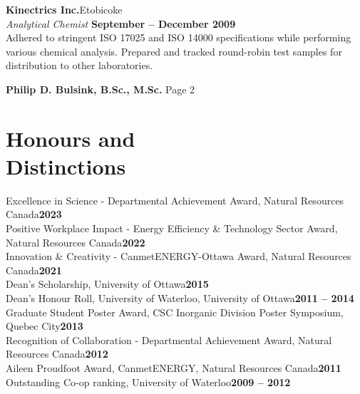 \documentclass[margin,line]{resumecls}
\begin{document}
\begin{resume}
    \textbf{Kinectrics Inc.}\hfill Etobicoke\\\vspace{1mm}%
    \textsl{Analytical Chemist} \hfill \textbf{September -- December 2009}\\
    Adhered to stringent ISO 17025 and ISO 14000 specifications while performing various chemical analysis.
    Prepared and tracked round-robin test samples for distribution to other laboratories.

\newpage
	\textbf{Philip D. Bulsink, B.Sc., M.Sc.} \hfill Page 2 \\
	\vspace{-4mm}
    \section{%
    \mysidestyle Honours and\\Distinctions}\label{sec:mysidestyle-honours-anddistinctions}

    Excellence in Science - Departmental Achievement Award,  Natural Resources Canada\hfill\textbf{2023}\vspace{1mm}\\%
    Positive Workplace Impact - Energy Efficiency \& Technology Sector Award, Natural Resources Canada\hfill\textbf{2022}\vspace{1mm}\\%
    Innovation \& Creativity - CanmetENERGY-Ottawa Award, Natural Resources Canada\hfill\textbf{2021}\vspace{1mm}\\%
    Dean's Scholarship, University of Ottawa\hfill\textbf{2015}\vspace{1mm}\\%
    Dean's Honour Roll, University of Waterloo, University of Ottawa\hfill\textbf{2011 -- 2014}\vspace{1mm}\\%
    Graduate Student Poster Award, CSC Inorganic Division Poster Symposium, Quebec City\hfill\textbf{2013}\vspace{1mm}\\%
    Recognition of Collaboration - Departmental Achievement Award, Natural Resources Canada\hfill\textbf{2012}\vspace{1mm}\\%
    Aileen Proudfoot Award, CanmetENERGY, Natural Resources Canada\hfill\textbf{2011}\vspace{1mm}\\%
    Outstanding Co-op ranking, University of Waterloo\hfill\textbf{2009 -- 2012}\vspace{1mm}%


\end{resume}
\end{document}
